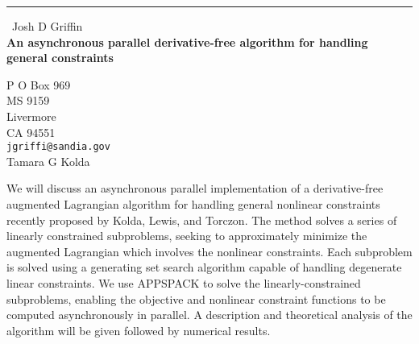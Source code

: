 \documentclass{report}
\begin{document}
\begin{center}
\rule{6in}{1pt} \
{\large Josh D Griffin \\
{\bf An asynchronous parallel derivative-free algorithm for handling general constraints }}

P O Box 969 \\ MS 9159 \\ Livermore \\ CA 94551
\\
{\tt jgriffi@sandia.gov}\\
Tamara G Kolda\end{center}

We will discuss an asynchronous parallel implementation of a
derivative-free augmented Lagrangian algorithm for handling general
nonlinear constraints recently proposed by Kolda, Lewis, and Torczon. The
method solves a series of linearly constrained subproblems, seeking to
approximately minimize the augmented Lagrangian which involves the
nonlinear constraints. Each subproblem is solved using a generating set
search algorithm capable of handling degenerate linear constraints. We
use APPSPACK to solve the linearly-constrained subproblems, enabling the
objective and nonlinear constraint functions to be computed
asynchronously in parallel. A description and theoretical analysis of the
algorithm will be given followed by numerical results.
\end{document}
